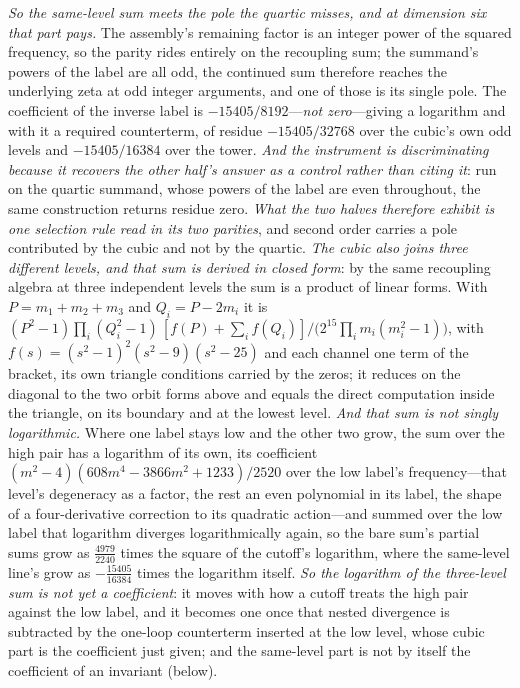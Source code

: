 \documentclass[11pt,a4paper]{article}
\theoremstyle{plain}
\theoremstyle{definition}
\theoremstyle{remark}
\begin{document}
\emph{So the same-level sum meets the pole the quartic misses, and at dimension six that part pays.} The assembly's
remaining factor is an integer power of the squared frequency, so the parity rides entirely on the recoupling sum;
the summand's powers of the label are all odd, the continued sum therefore reaches the underlying zeta at odd
integer arguments, and one of those is its single pole. The coefficient of the inverse label is
$-15405/8192$---\emph{not zero}---giving a logarithm and with it a required counterterm, of residue $-15405/32768$
over the cubic's own odd levels and $-15405/16384$ over the tower. \emph{And the instrument is discriminating
because it recovers the other half's answer as a control rather than citing it}: run on the quartic summand, whose
powers of the label are even throughout, the same construction returns residue zero. \emph{What the two halves
therefore exhibit is one selection rule read in its two parities}, and second order carries a pole contributed by
the cubic and not by the
quartic. \emph{The cubic also joins three different levels, and that sum is derived in closed form}:
by the same recoupling algebra at three independent levels the sum is a product of linear forms. With
$P=m_{1}+m_{2}+m_{3}$ and $Q_{i}=P-2m_{i}$ it is
$(P^{2}-1)\prod_{i}(Q_{i}^{2}-1)\,[f(P)+\sum_{i}f(Q_{i})]/\bigl(2^{15}\prod_{i}m_{i}(m_{i}^{2}-1)\bigr)$, with
$f(s)=(s^{2}-1)^{2}(s^{2}-9)(s^{2}-25)$ and each channel one term of the bracket, its own triangle conditions
carried by the zeros; it reduces on the diagonal to the two orbit forms above and equals the direct computation
inside the triangle, on its boundary and at the lowest level. \emph{And that sum is not singly logarithmic.} Where one label stays low and the other two grow, the sum
over the high pair has a logarithm of its own, its coefficient $(m^{2}-4)(608m^{4}-3866m^{2}+1233)/2520$ over the
low label's frequency---that level's degeneracy as a factor, the rest an even polynomial in its label, the shape of a
four-derivative correction to its quadratic action---and summed over the low label that logarithm diverges
logarithmically again, so the bare sum's partial sums grow as $\tfrac{4979}{2240}$ times the square of the
cutoff's logarithm, where the same-level line's grow as $-\tfrac{15405}{16384}$ times the logarithm itself. \emph{So the
logarithm of the three-level sum is not yet a coefficient}: it moves with how a cutoff treats the high pair
against the low label, and it becomes one once that nested divergence is subtracted by the one-loop counterterm
inserted at the low level, whose cubic part is the coefficient just given; and the same-level part is not by
itself the coefficient of an invariant
(below).
\end{document}
